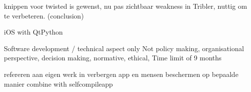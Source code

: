 knippen voor twisted is gewenst, nu pas zichtbaar weakness in Tribler, nuttig om te verbeteren. (conclusion)


iOS with QtPython


Software development / technical aspect only
Not policy making, organisational perspective, decision making, normative, ethical,
Time limit of 9 months


refereren aan eigen werk in verbergen app en mensen beschermen op bepaalde manier
combine with selfcompileapp
